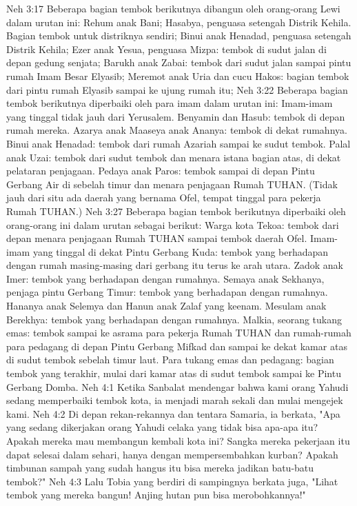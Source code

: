 Neh 3:17  Beberapa bagian tembok berikutnya dibangun oleh orang-orang Lewi dalam urutan ini: Rehum anak Bani; Hasabya, penguasa setengah Distrik Kehila. Bagian tembok untuk distriknya sendiri; Binui anak Henadad, penguasa setengah Distrik Kehila; Ezer anak Yesua, penguasa Mizpa: tembok di sudut jalan di depan gedung senjata; Barukh anak Zabai: tembok dari sudut jalan sampai pintu rumah Imam Besar Elyasib; Meremot anak Uria dan cucu Hakos: bagian tembok dari pintu rumah Elyasib sampai ke ujung rumah itu;
Neh 3:22  Beberapa bagian tembok berikutnya diperbaiki oleh para imam dalam urutan ini: Imam-imam yang tinggal tidak jauh dari Yerusalem. Benyamin dan Hasub: tembok di depan rumah mereka. Azarya anak Maaseya anak Ananya: tembok di dekat rumahnya. Binui anak Henadad: tembok dari rumah Azariah sampai ke sudut tembok. Palal anak Uzai: tembok dari sudut tembok dan menara istana bagian atas, di dekat pelataran penjagaan. Pedaya anak Paros: tembok sampai di depan Pintu Gerbang Air di sebelah timur dan menara penjagaan Rumah TUHAN. (Tidak jauh dari situ ada daerah yang bernama Ofel, tempat tinggal para pekerja Rumah TUHAN.)
Neh 3:27  Beberapa bagian tembok berikutnya diperbaiki oleh orang-orang ini dalam urutan sebagai berikut: Warga kota Tekoa: tembok dari depan menara penjagaan Rumah TUHAN sampai tembok daerah Ofel. Imam-imam yang tinggal di dekat Pintu Gerbang Kuda: tembok yang berhadapan dengan rumah masing-masing dari gerbang itu terus ke arah utara. Zadok anak Imer: tembok yang berhadapan dengan rumahnya. Semaya anak Sekhanya, penjaga pintu Gerbang Timur: tembok yang berhadapan dengan rumahnya. Hananya anak Selemya dan Hanun anak Zalaf yang keenam. Mesulam anak Berekhya: tembok yang berhadapan dengan rumahnya. Malkia, seorang tukang emas: tembok sampai ke asrama para pekerja Rumah TUHAN dan rumah-rumah para pedagang di depan Pintu Gerbang Mifkad dan sampai ke dekat kamar atas di sudut tembok sebelah timur laut. Para tukang emas dan pedagang: bagian tembok yang terakhir, mulai dari kamar atas di sudut tembok sampai ke Pintu Gerbang Domba.
Neh 4:1  Ketika Sanbalat mendengar bahwa kami orang Yahudi sedang memperbaiki tembok kota, ia menjadi marah sekali dan mulai mengejek kami.
Neh 4:2  Di depan rekan-rekannya dan tentara Samaria, ia berkata, "Apa yang sedang dikerjakan orang Yahudi celaka yang tidak bisa apa-apa itu? Apakah mereka mau membangun kembali kota ini? Sangka mereka pekerjaan itu dapat selesai dalam sehari, hanya dengan mempersembahkan kurban? Apakah timbunan sampah yang sudah hangus itu bisa mereka jadikan batu-batu tembok?"
Neh 4:3  Lalu Tobia yang berdiri di sampingnya berkata juga, "Lihat tembok yang mereka bangun! Anjing hutan pun bisa merobohkannya!"
